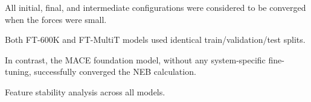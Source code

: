 \documentclass{article}
\providecommand{\reviewermap}[3]{}
\begin{document}
\reviewermap{REV-A1}{partial}{DFT NEB references must include per-path convergence status; current path 1-4 reference candidate is 0.336050 eV.}
All initial, final, and intermediate configurations were considered to be converged when the forces were small.
\reviewermap{REV-A2/REV-C10}{pending}{Grouped split and train/test overlap audit must be documented once SOAP/RMSD values are available.}
Both FT-600K and FT-MultiT models used identical train/validation/test splits.
\reviewermap{REV-A1}{partial}{SI Fig. S3 is self-consistent MLFF NEB; 0.41 eV is a model-reported MLFF barrier, not a fixed-path DFT-reference error.}
In contrast, the MACE foundation model, without any system-specific fine-tuning, successfully converged the NEB calculation.
\reviewermap{REV-A1}{partial}{Caption must say model-reported MLFF barrier and distinguish self-consistent MLFF NEB from fixed-geometry DFT-path scoring.}
\caption{Nudged Elastic Band benchmark yielding a migration barrier of 0.41 eV.}
\reviewermap{REV-A6/REV-C13}{partial}{Report SHAP surrogate CV R2 and final code-release provenance.}
Feature stability analysis across all models.
\end{document}
